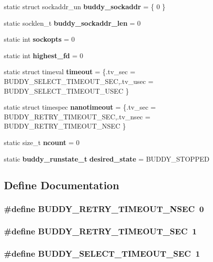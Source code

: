 \begin{DoxyCompactItemize}
$$static struct sockaddr\_\-un {\bf buddy\_\-sockaddr} = \{ 0 \}
\item 
static socklen\_\-t {\bf buddy\_\-sockaddr\_\-len} = 0
\item 
static int {\bf sockopts} = 0
\item 
static int {\bf highest\_\-fd} = 0
\item 
static struct timeval {\bf timeout} = \{.tv\_\-sec = BUDDY\_\-SELECT\_\-TIMEOUT\_\-SEC,.tv\_\-usec = BUDDY\_\-SELECT\_\-TIMEOUT\_\-USEC \}
\item 
static struct timespec {\bf nanotimeout} = \{.tv\_\-sec = BUDDY\_\-RETRY\_\-TIMEOUT\_\-SEC,.tv\_\-nsec = BUDDY\_\-RETRY\_\-TIMEOUT\_\-NSEC \}
\item 
static size\_\-t {\bf ncount} = 0
\item 
static {\bf buddy\_\-runstate\_\-t} {\bf desired\_\-state} = BUDDY\_\-STOPPED
\end{DoxyCompactItemize}


\subsection{Define Documentation}
\subsubsection[{BUDDY\_\-RETRY\_\-TIMEOUT\_\-NSEC}]{\setlength{\rightskip}{0pt plus 5cm}\#define BUDDY\_\-RETRY\_\-TIMEOUT\_\-NSEC~0}\label{buddy_8c_a374adc6ab83d41ad69c660812a5e3854}
\subsubsection[{BUDDY\_\-RETRY\_\-TIMEOUT\_\-SEC}]{\setlength{\rightskip}{0pt plus 5cm}\#define BUDDY\_\-RETRY\_\-TIMEOUT\_\-SEC~1}\label{buddy_8c_a597f1456de2807772248521856a6ca1c}
\subsubsection[{BUDDY\_\-SELECT\_\-TIMEOUT\_\-SEC}]{\setlength{\rightskip}{0pt plus 5cm}\#define BUDDY\_\-SELECT\_\-TIMEOUT\_\-SEC~1}\label{buddy_8c_a626b2fe03c7debfb60486ae00bf30ce1}


